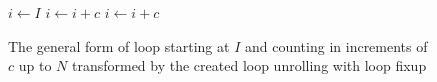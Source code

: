 \begin{figure}[H]
    \centering
    \begin{algorithmic}
        \State $i \gets I$
                \State {} 
                \State $i \gets i + c$ 
            \EndWhile
        \EndIf
            \State {}
            \State $i \gets i + c$
        \EndWhile
        \EndFunction
    \end{algorithmic}
    \caption{The general form of loop starting at $I$ and counting in increments of $c$ up to $N$ transformed by the created loop unrolling with loop fixup}
    \label{fig:impl:fixup:loop:general-loop}
\end{figure}